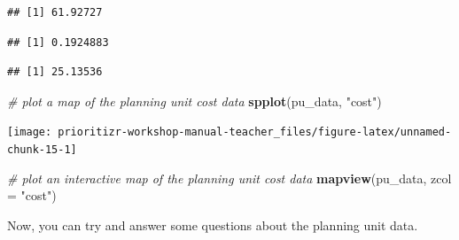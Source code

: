\documentclass[12pt,]{book}
\newenvironment{Shaded}{\begin{snugshade}}{\end{snugshade}}
\newcommand{\KeywordTok}[1]{\textcolor[rgb]{0.13,0.29,0.53}{\textbf{#1}}}
\newcommand{\DataTypeTok}[1]{\textcolor[rgb]{0.13,0.29,0.53}{#1}}
\newcommand{\StringTok}[1]{\textcolor[rgb]{0.31,0.60,0.02}{#1}}
\newcommand{\CommentTok}[1]{\textcolor[rgb]{0.56,0.35,0.01}{\textit{#1}}}
\newcommand{\OperatorTok}[1]{\textcolor[rgb]{0.81,0.36,0.00}{\textbf{#1}}}
\newcommand{\NormalTok}[1]{#1}
\begin{document}
\begin{verbatim}
## [1] 61.92727
\end{verbatim}

\begin{Shaded}
\end{Shaded}

\begin{verbatim}
## [1] 0.1924883
\end{verbatim}

\begin{Shaded}
\end{Shaded}

\begin{verbatim}
## [1] 25.13536
\end{verbatim}

\begin{Shaded}
\begin{Highlighting}[]
\CommentTok{# plot a map of the planning unit cost data}
\KeywordTok{spplot}\NormalTok{(pu_data, }\StringTok{"cost"}\NormalTok{)}
\end{Highlighting}
\end{Shaded}

\begin{center}\texttt{[image: prioritizr-workshop-manual-teacher\_files/figure-latex/unnamed-chunk-15-1]} \end{center}

\begin{Shaded}
\begin{Highlighting}[]
\CommentTok{# plot an interactive map of the planning unit cost data}
\KeywordTok{mapview}\NormalTok{(pu_data, }\DataTypeTok{zcol =} \StringTok{"cost"}\NormalTok{)}
\end{Highlighting}
\end{Shaded}

\clearpage

Now, you can try and answer some questions about the planning unit data.
\end{document}
